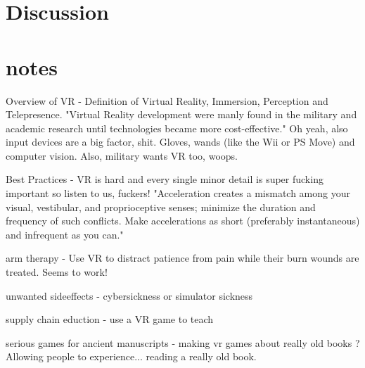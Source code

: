 \documentclass[11pt]{report}
\begin{document}
	


\chapter{Discussion}








\chapter{notes}
Overview of VR - Definition of Virtual Reality, Immersion, Perception and Telepresence. 
"Virtual Reality development were manly found in the military and academic research until technologies became more cost-effective."
Oh yeah, also input devices are a big factor, shit. Gloves, wands (like the Wii or PS Move) and computer vision.
Also, military wants VR too, woops.
	
Best Practices - VR is hard and every single minor detail is super fucking important so listen to us, fuckers!
"Acceleration creates a mismatch among your visual, vestibular, and proprioceptive senses;
minimize the duration and frequency of such conflicts. Make accelerations as short (preferably
instantaneous) and infrequent as you can."

arm therapy - Use VR to distract patience from pain while their burn wounds are treated. Seems to work!

unwanted sideeffects - cybersickness or simulator sickness

supply chain eduction - use a VR game to teach

serious games for ancient manuscripts - making vr games about really old books ? Allowing people to experience... reading a really old book.
\end{document}
